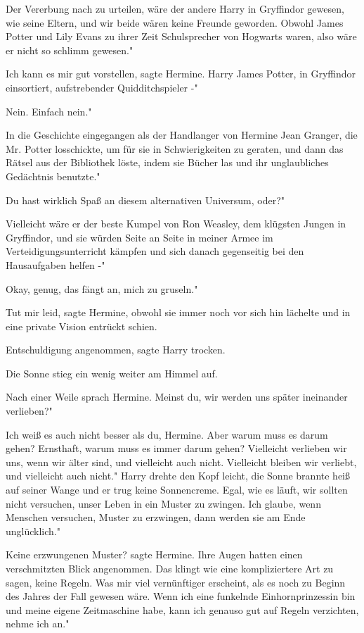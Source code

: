 \glqq Der Vererbung nach zu urteilen, wäre der andere Harry in Gryffindor
gewesen, wie seine Eltern, und wir beide wären keine Freunde geworden. Obwohl
James Potter und Lily Evans zu ihrer Zeit Schulsprecher von Hogwarts waren, also
wäre er nicht so schlimm gewesen."

\glqq Ich kann es mir gut vorstellen\grqq{}, sagte Hermine. \glqq Harry James
Potter, in Gryffindor einsortiert, aufstrebender Quidditchspieler -"

\glqq Nein. Einfach nein."

\glqq In die Geschichte eingegangen als der Handlanger von Hermine Jean Granger,
die Mr. Potter losschickte, um für sie in Schwierigkeiten zu geraten, und dann
das Rätsel aus der Bibliothek löste, indem sie Bücher las und ihr unglaubliches
Gedächtnis benutzte."

\glqq Du hast wirklich Spaß an diesem alternativen Universum, oder?"

\glqq Vielleicht wäre er der beste Kumpel von Ron Weasley, dem klügsten Jungen
in Gryffindor, und sie würden Seite an Seite in meiner Armee im
Verteidigungsunterricht kämpfen und sich danach gegenseitig bei den Hausaufgaben
helfen -"

\glqq Okay, genug, das fängt an, mich zu gruseln."

\glqq Tut mir leid\grqq{}, sagte Hermine, obwohl sie immer noch vor sich hin
lächelte und in eine private Vision entrückt schien.

\glqq Entschuldigung angenommen\grqq{}, sagte Harry trocken.

Die Sonne stieg ein wenig weiter am Himmel auf.

Nach einer Weile sprach Hermine. \glqq Meinst du, wir werden uns später
ineinander verlieben?"

\glqq Ich weiß es auch nicht besser als du, Hermine. Aber warum muss es darum
gehen? Ernsthaft, warum muss es immer darum gehen? Vielleicht verlieben wir uns,
wenn wir älter sind, und vielleicht auch nicht. Vielleicht bleiben wir verliebt,
und vielleicht auch nicht." Harry drehte den Kopf leicht, die Sonne brannte heiß
auf seiner Wange und er trug keine Sonnencreme. \glqq Egal, wie es läuft, wir
sollten nicht versuchen, unser Leben in ein Muster zu zwingen. Ich glaube, wenn
Menschen versuchen, Muster zu erzwingen, dann werden sie am Ende unglücklich."

\glqq Keine erzwungenen Muster?\grqq{} sagte Hermine. Ihre Augen hatten einen
verschmitzten Blick angenommen. \glqq Das klingt wie eine kompliziertere Art zu
sagen, keine Regeln. Was mir viel vernünftiger erscheint, als es noch zu Beginn
des Jahres der Fall gewesen wäre. Wenn ich eine funkelnde Einhornprinzessin bin
und meine eigene Zeitmaschine habe, kann ich genauso gut auf Regeln verzichten,
nehme ich an."

